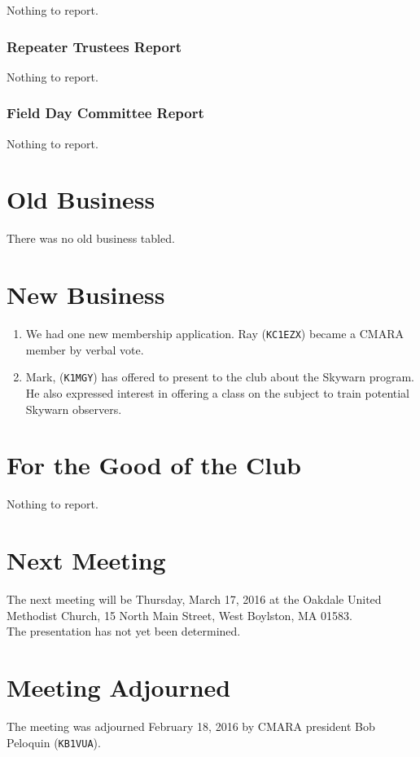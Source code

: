 \documentclass[10pt,letterpaper]{article}
\begin{document}
Nothing to report.

\subsubsection{Repeater Trustees Report}

Nothing to report.

\subsubsection{Field Day Committee Report}

Nothing to report.

\section{Old Business}

There was no old business tabled.

\section{New Business}

\begin{enumerate}
\item We had one new membership application. Ray (\texttt{KC1EZX}) became a CMARA member by verbal vote.
\item Mark, (\texttt{K1MGY}) has offered to present to the club about the Skywarn program. He also expressed interest in offering a class on the subject to train potential Skywarn observers.

\end{enumerate}

\section{For the Good of the Club}

Nothing to report.

\section{Next Meeting}

The next meeting will be Thursday, March 17, 2016 at the Oakdale United Methodist Church, 15 North Main Street, West Boylston, MA 01583.\\

\noindent
The presentation has not yet been determined.

\section{Meeting Adjourned}
The meeting was adjourned February 18, 2016 by CMARA president Bob Peloquin (\texttt{KB1VUA}).
\end{document}
